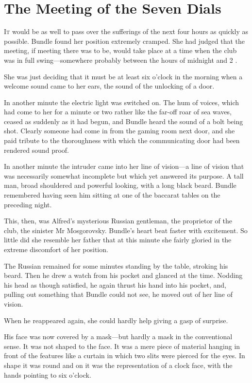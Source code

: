 \chapter{The Meeting of the Seven Dials}

\lettrine{I}{t} would be as well to pass over the sufferings of the next four hours as quickly as possible. Bundle found her position extremely cramped. She had judged that the meeting, if meeting there was to be, would take place at a time when the club was in full swing—somewhere probably between the hours of midnight and 2 .

She was just deciding that it must be at least six o'clock in the morning when a welcome sound came to her ears, the sound of the unlocking of a door.

In another minute the electric light was switched on. The hum of voices, which had come to her for a minute or two rather like the far-off roar of sea waves, ceased as suddenly as it had begun, and Bundle heard the sound of a bolt being shot. Clearly someone had come in from the gaming room next door, and she paid tribute to the thoroughness with which the communicating door had been rendered sound proof.

In another minute the intruder came into her line of vision—a line of vision that was necessarily somewhat incomplete but which yet answered its purpose. A tall man, broad shouldered and powerful looking, with a long black beard. Bundle remembered having seen him sitting at one of the baccarat tables on the preceding night.

This, then, was Alfred's mysterious Russian gentleman, the proprietor of the club, the sinister Mr Mosgorovsky. Bundle's heart beat faster with excitement. So little did she resemble her father that at this minute she fairly gloried in the extreme discomfort of her position.

The Russian remained for some minutes standing by the table, stroking his beard. Then he drew a watch from his pocket and glanced at the time. Nodding his head as though satisfied, he again thrust his hand into his pocket, and, pulling out something that Bundle could not see, he moved out of her line of vision.

When he reappeared again, she could hardly help giving a gasp of surprise.

His face was now covered by a mask—but hardly a mask in the conventional sense. It was not shaped to the face. It was a mere piece of material hanging in front of the features like a curtain in which two slits were pierced for the eyes. In shape it was round and on it was the representation of a clock face, with the hands pointing to six o'clock.


